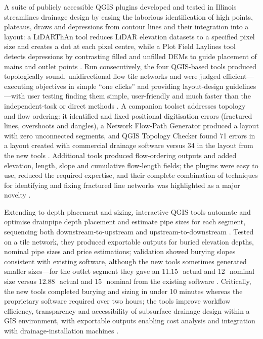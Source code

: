 \documentclass[11pt]{article}
\begin{document}
A suite of publicly accessible QGIS plugins developed and tested in Illinois streamlines drainage design by easing the laborious identification of high points, plateaus, draws and depressions from contour lines and their integration into a layout: a LiDARThAn tool reduces LiDAR elevation datasets to a specified pixel size and creates a dot at each pixel centre, while a Plot Field Laylines tool detects depressions by contrasting filled and unfilled DEMs to guide placement of mains and outlet points \parencite{Falasy2025}. Run consecutively, the four QGIS-based tools produced topologically sound, unidirectional flow tile networks and were judged efficient---executing objectives in simple ``one clicks'' and providing layout-design guidelines---with user testing finding them simple, user-friendly and much faster than the independent-task or direct methods \parencite{Falasy2025}. A companion toolset addresses topology and flow ordering: it identified and fixed positional digitisation errors (fractured lines, overshoots and dangles), a Network Flow-Path Generator produced a layout with zero unconnected segments, and QGIS Topology Checker found 71 errors in a layout created with commercial drainage software versus 34 in the layout from the new tools \parencite{Falasy2024}. Additional tools produced flow-ordering outputs and added elevation, length, slope and cumulative flow-length fields; the plugins were easy to use, reduced the required expertise, and their complete combination of techniques for identifying and fixing fractured line networks was highlighted as a major novelty \parencite{Falasy2024}.

Extending to depth placement and sizing, interactive QGIS tools automate and optimise drainpipe depth placement and estimate pipe sizes for each segment, sequencing both downstream-to-upstream and upstream-to-downstream \parencite{Falasy2025b}. Tested on a tile network, they produced exportable outputs for buried elevation depths, nominal pipe sizes and price estimations; validation showed burying slopes consistent with existing software, although the new tools sometimes generated smaller sizes---for the outlet segment they gave an 11.15\,\textquotedbl\ actual and 12\,\textquotedbl\ nominal size versus 12.88\,\textquotedbl\ actual and 15\,\textquotedbl\ nominal from the existing software \parencite{Falasy2025b}. Critically, the new tools completed burying and sizing in under 10 minutes whereas the proprietary software required over two hours; the tools improve workflow efficiency, transparency and accessibility of subsurface drainage design within a GIS environment, with exportable outputs enabling cost analysis and integration with drainage-installation machines \parencite{Falasy2025b}.
\end{document}

